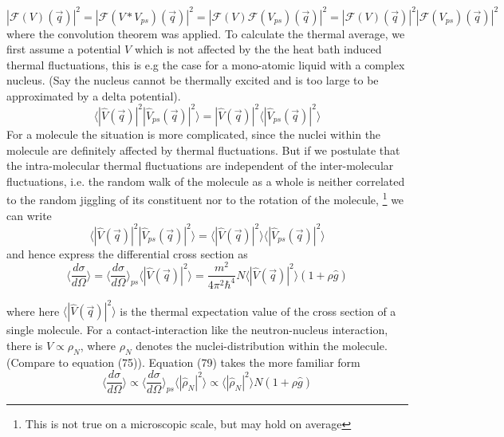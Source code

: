 \documentclass[11pt,a4paper]{article}
\begin{document}
\begin{equation}
|\mathcal{F} (V) (\vec q)|^2 =
|\mathcal{F} (V*V_{ps}) (\vec q)|^2 =
|\mathcal{F} (V) \mathcal{F}(V_{ps}) (\vec q)|^2 =
|\mathcal{F} (V)(\vec q)|^2 |\mathcal{F}(V_{ps}) (\vec q)|^2
\end{equation}
where the convolution theorem was applied. To calculate the thermal average, we first assume a potential $V$ which is not affected 
by the the heat bath induced thermal fluctuations, this is e.g the case for a mono-atomic liquid with a complex nucleus. 
(Say the nucleus cannot be thermally excited and is too large to be approximated by a delta potential).
\begin{equation}
\langle |\hat V (\vec q)|^2  | \hat V_{ps}(\vec q)|^2 \rangle
= |\hat V (\vec q)|^2 \langle   | \hat V_{ps}(\vec q)|^2 \rangle
\end{equation}
For a molecule the situation is more complicated, since the nuclei within the molecule are definitely affected by thermal
fluctuations. But if we postulate that the intra-molecular thermal fluctuations are independent of the inter-molecular fluctuations,
i.e. the random  walk of the molecule as a whole is neither correlated to the random jiggling of its constituent nor to the rotation of the molecule,
\footnote{This is not true on a microscopic scale, but may hold on average} we can write
\begin{equation}
\langle |\hat V (\vec q)|^2  | \hat V_{ps}(\vec q)|^2 \rangle
= \langle|\hat V (\vec q)|^2 \rangle \langle   | \hat V_{ps}(\vec q)|^2 \rangle
\end{equation}
and hence express the differential cross section  as
\begin{equation}
\langle \frac{d \sigma} {d\Omega} \rangle = 
\langle \frac{d \sigma} {d\Omega} \rangle_{ps}
\langle|\hat V (\vec q)|^2 \rangle
=
\frac{m^2}{4 \pi^2 \hbar^4} N
\langle|\hat V (\vec q)|^2 \rangle (1 + \rho \hat g)
\end{equation}

where here $\langle | \hat V (\vec q)|^2 \rangle$ is the thermal expectation value of the cross section of a single molecule.
\newpage
For a contact-interaction like the neutron-nucleus interaction, there is $V \propto \rho_N$, where $\rho_N$ denotes
the nuclei-distribution within the molecule. (Compare to equation (75)). Equation (79) takes the more familiar form
\begin{equation}
\langle \frac{d \sigma} {d\Omega} \rangle 
\propto
\langle \frac{d \sigma} {d\Omega} \rangle_{ps}
\langle|\hat \rho_N|^2 \rangle
\propto
\langle|\hat \rho_N|^2 \rangle N (1 + \rho \hat g)
\end{equation}
\end{document}
